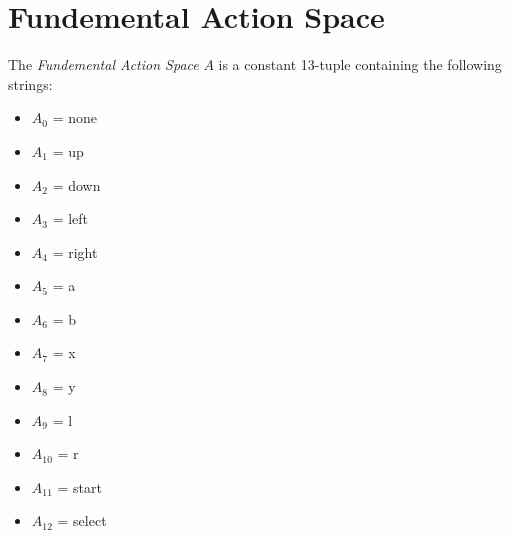 \section{Fundemental Action Space}

The \emph{Fundemental Action Space} $A$ is a constant 13-tuple containing the following strings:
\begin{itemize}
    \item $A_{0}$  = none
    \item $A_{1}$  = up
    \item $A_{2}$  = down
    \item $A_{3}$  = left
    \item $A_{4}$  = right
    \item $A_{5}$  = a
    \item $A_{6}$  = b
    \item $A_{7}$  = x
    \item $A_{8}$  = y
    \item $A_{9}$  = l
    \item $A_{10}$ = r
    \item $A_{11}$ = start
    \item $A_{12}$ = select
\end{itemize}
